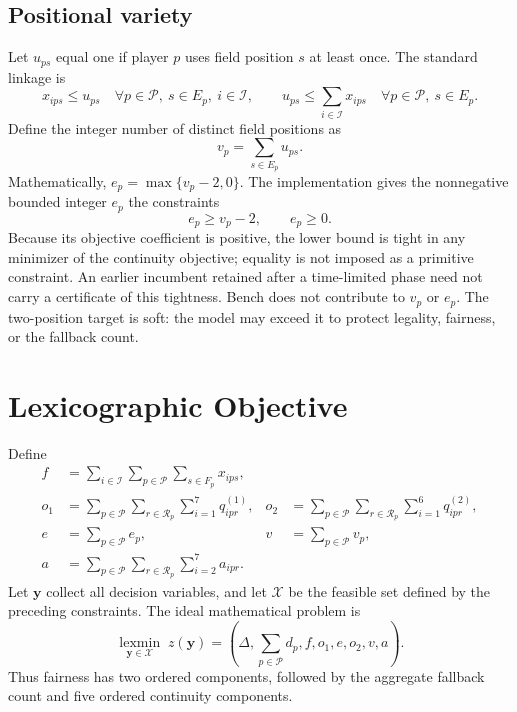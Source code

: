 \documentclass[11pt]{article}
\begin{document}
\subsection{Positional variety}

Let $u_{ps}$ equal one if player $p$ uses field position $s$ at least once.
The standard linkage is
\[
x_{ips}\leq u_{ps}\quad
\forall p\in\mathcal P,\ s\in E_p,\ i\in\mathcal I,
\qquad
u_{ps}\leq\sum_{i\in\mathcal I}x_{ips}\quad
\forall p\in\mathcal P,\ s\in E_p.
\]
Define the integer number of distinct field positions as
\[
v_p=\sum_{s\in E_p}u_{ps}.
\]
Mathematically, $e_p=\max\{v_p-2,0\}$. The implementation gives the
nonnegative bounded integer $e_p$ the constraints
\[
e_p\geq v_p-2,\qquad e_p\geq0.
\]
Because its objective coefficient is positive, the lower bound is tight in any
minimizer of the continuity objective; equality is not imposed as a primitive
constraint. An earlier incumbent retained after a time-limited phase need not
carry a certificate of this tightness.
Bench does not contribute to $v_p$ or $e_p$. The two-position target is soft:
the model may exceed it to protect legality, fairness, or the fallback count.

\section{Lexicographic Objective}

Define
\[
\begin{aligned}
f&=\sum_{i\in\mathcal I}\sum_{p\in\mathcal P}
     \sum_{s\in F_p}x_{ips},\\
o_1&=\sum_{p\in\mathcal P}\sum_{r\in\mathcal R_p}
     \sum_{i=1}^{7}q^{(1)}_{ipr}, &
o_2&=\sum_{p\in\mathcal P}\sum_{r\in\mathcal R_p}
     \sum_{i=1}^{6}q^{(2)}_{ipr},\\
e&=\sum_{p\in\mathcal P}e_p, &
v&=\sum_{p\in\mathcal P}v_p,\\
a&=\sum_{p\in\mathcal P}\sum_{r\in\mathcal R_p}
     \sum_{i=2}^{7}a_{ipr}.
\end{aligned}
\]
Let $\boldsymbol y$ collect all decision variables, and let $\mathcal X$ be the
feasible set defined by the preceding constraints. The ideal mathematical
problem is
\begin{equation}
\underset{\boldsymbol y\in\mathcal X}{\operatorname{lexmin}}\;
z(\boldsymbol y)=\left(\Delta,\sum_{p\in\mathcal P}d_p,
f,o_1,e,o_2,v,a\right).
\label{eq:lex-objective}
\end{equation}
Thus fairness has two ordered components, followed by the aggregate fallback
count and five ordered continuity components.
\end{document}

